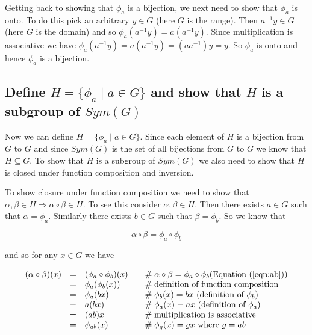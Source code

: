 \documentclass{article}
\theoremstyle{definition}
\begin{document}
\bigskip
\noindent
Getting back to showing that $\phi_{a}$ is a bijection, we next
need to show that $\phi_{a}$ is onto. To do this pick an
arbitrary $y \in G$ (here $G$ is the range).  Then $a^{-1}y \in
G$ (here $G$ is the domain) and so $\phi_{a}(a^{-1}y) =
a(a^{-1}y)$. Since multiplication is associative we have
$\phi_{a}(a^{-1}y) = a(a^{-1}y) = (aa^{-1})y = y$. So $\phi_{a}$
is onto and hence $\phi_{a}$ is a bijection.
 
 
\subsection{Define $H = \{\phi_{a} \mid a \in G\}$ and show that $H$ is a subgroup of $Sym(G)$}
Now we can define $H = \{\phi_a \mid a \in G\}$. Since each
element of $H$ is a bijection from $G$ to $G$ and since $Sym(G)$
is the set of all bijections from $G$ to $G$ we know that $H
\subseteq G$. To show that $H$ is a subgroup of $Sym(G)$ we also
need to show that $H$ is closed under function composition and
inversion.

\bigskip
\noindent
To show closure under function composition we need to show that
$\alpha, \beta \in H \Rightarrow \alpha \circ \beta \in H$.  To
see this consider $\alpha, \beta \in H$. Then there exists $a \in
G$ such that $\alpha = \phi_{a}$. Similarly there exists $b \in
G$ such that $\beta = \phi_b$. So we know that

\begin{equation}
\alpha \circ \beta = \phi_a \circ \phi_b
\label{eqn:ab}
\end{equation}
 
\bigskip
\noindent
and so for any $x \in G$ we have

\bigskip
\begin{equation}
\begin{array}{rcll}
(\alpha \circ \beta)(x)  
&=& (\phi_a \circ \phi_b)(x)    &\quad  \mathrel{\#}  \alpha \circ \beta = \phi_a \circ \phi_b \text{(Equation (\ref{eqn:ab}))} \\
&=& \phi_{a}(\phi_{b}(x))       &\quad  \mathrel{\#} \text{definition of function composition} \\
&=& \phi_{a}(bx)                &\quad  \mathrel{\#} \phi_b(x) = bx \text{ (definition of $\phi_b$)} \\
&=& a(bx)                       &\quad  \mathrel{\#} \phi_a(x) = ax \text{ (definition of $\phi_a$)} \\
&=& (ab)x                       &\quad  \mathrel{\#} \text{multiplication is associative} \\
&=& \phi_{ab}(x)                &\quad  \mathrel{\#} \phi_{g}(x) =gx  \text{ where $g=ab$}
\end{array}
\label{eqn:function_composition}
\end{equation}
\end{document}
